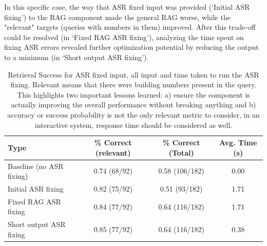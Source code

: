 \documentclass{article}
\begin{document}
In this specific case, the way that ASR fixed input was provided (`Initial ASR fixing') to the RAG component made the general RAG worse, while the "relevant" targets (queries with numbers in them) improved. After this trade-off could be resolved (in `Fixed RAG ASR fixing'), analyzing the time spent on fixing ASR errors revealed further optimization potential by reducing the output to a minimum (in `Short output ASR fixing').

\begin{table}[H]
\centering
\begin{tabular}{|l|c|c|c|}
\hline
\textbf{Type} & \textbf{\% Correct (relevant)} & \textbf{\% Correct (Total)} & \textbf{Avg. Time (s)} \\
\hline
Baseline (no ASR fixing) & 0.74 (68/92) & 0.58 (106/182) & 0.00 \\
Initial ASR fixing       & 0.82 (75/92) & 0.51 (93/182)  & 1.71 \\
Fixed RAG ASR fixing     & 0.84 (77/92) & 0.64 (116/182) & 1.71 \\
Short output ASR fixing  & 0.85 (77/92) & 0.64 (116/182) & 0.38 \\
\hline
\end{tabular}
\caption{Retrieval Success for ASR fixed input, all input and time taken to run the ASR fixing. Relevant means that there were building numbers present in the query. This highlights two important lessons learned: a) ensure the component is actually improving the overall performance without breaking anything and b) accuracy or success probability is not the only relevant metric to consider, in an interactive system, response time should be considered as well.}
\end{table}

\end{document}
